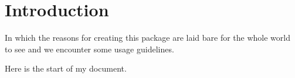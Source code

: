 
\chapter{Introduction}


\begin{center}
  \begin{minipage}{0.5\textwidth}
    \begin{small}
      In which the reasons for creating this package are laid bare for the
      whole world to see and we encounter some usage guidelines.
    \end{small}
  \end{minipage}
  \vspace{0.5cm}
\end{center}


Here is the start of my document.

